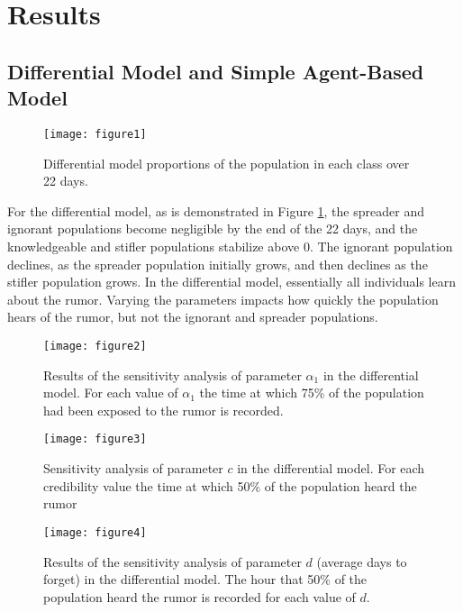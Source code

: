 \section{Results }
\label{sec:results}

\subsection{Differential Model and Simple Agent-Based Model}
\label{subsec:basicmod}

\begin{figure}[H]
\captionsetup{width=0.6\textwidth}
\centering
    \texttt{[image: figure1]}
  \caption{ Differential model proportions of the population in each class over 22 days. }
  \label{fig:figure1}
\end{figure}

For the differential model, as is demonstrated in Figure \ref{fig:figure1}, the spreader and ignorant populations become negligible by the end of the 22 days, and the knowledgeable and stifler populations stabilize above 0. The ignorant population declines, as the spreader population initially grows, and then declines as the stifler population grows. In the differential model, essentially all individuals learn about the rumor. Varying the parameters impacts how quickly the population hears of the rumor, but not the ignorant and spreader populations.
	
\begin{figure}[H]
\captionsetup{width=0.8\textwidth}
\centering
    \texttt{[image: figure2]}
  \caption{ Results of the sensitivity analysis of parameter $ \alpha_1 $ in the differential model. For each value of $ \alpha_1 $ the time at which 75\% of the population had been exposed to the rumor is recorded. }
  \label{fig:figure2}
\end{figure}

\begin{figure}[H]
\captionsetup{width=0.8\textwidth}
\centering
    \texttt{[image: figure3]}
  \caption{ Sensitivity analysis of parameter $ c $ in the differential model. For each credibility value the time at which 50\% of the population heard the rumor }
  \label{fig:figure3}
\end{figure}

\begin{figure}[H]
\captionsetup{width=0.8\textwidth}
\centering
    \texttt{[image: figure4]}
  \caption{Results of the sensitivity analysis of parameter $ d $ (average days to forget) in the differential model. The hour that 50\% of the population heard the rumor is recorded for each value of $ d $.}
  \label{fig:figure4}
\end{figure}
	
